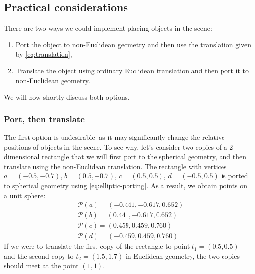 \subsection{Practical considerations} \label{subsec:practical_considerations}%
There are two ways we could implement placing objects in the scene:
\begin{enumerate}
    \item Port the object to non-Euclidean geometry and then use the translation given by \autoref{eq:translation},
    \item Translate the object using ordinary Euclidean translation and then port it to non-Euclidean geometry.
\end{enumerate}
We will now shortly discuss both options.

\subsubsection*{Port, then translate}
The first option is undesirable, as it may significantly change the relative positions of objects in the scene.
To see why, let's consider two copies of a 2-dimensional rectangle that we will first port to the spherical geometry, and then translate using the non-Euclidean translation.
The rectangle with vertices $a = (-0.5, -0.7)$, $b = (0.5, -0.7)$, $c = (0.5, 0.5)$, $d = (-0.5, 0.5)$ is ported to spherical geometry using \autoref{eq:elliptic-porting}.
As a result, we obtain points on a unit sphere:
\begin{equation*}
    \begin{split}
         & \mathcal{P}(a) = (-0.441, -0.617, 0.652) \\
         & \mathcal{P}(b) = (0.441, -0.617, 0.652)  \\
         & \mathcal{P}(c) = (0.459, 0.459, 0.760)   \\
         & \mathcal{P}(d) = (-0.459, 0.459, 0.760)
    \end{split}
\end{equation*}
If we were to translate the first copy of the rectangle to point $t_1 = (0.5, 0.5)$ and the second copy to $t _2 = (1.5, 1.7)$ in Euclidean geometry, the two copies should meet at the point $(1, 1)$.

